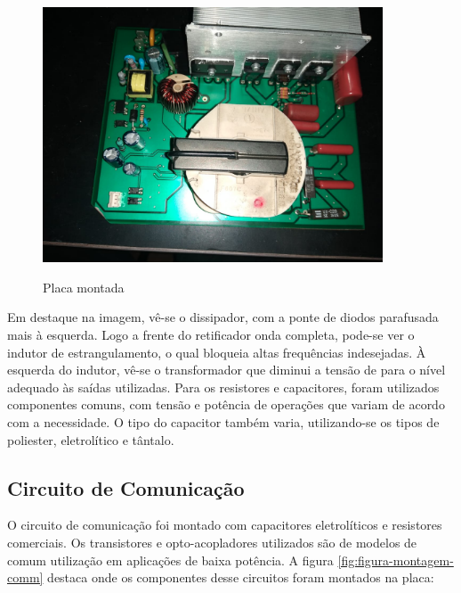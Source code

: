 \begin{figure}[H]
    \centering
    \caption{Placa montada}
    \includegraphics[width=0.9\textwidth]{./dados/figuras/placa_hv}
    \label{fig:figura-montagem-font}
\end{figure}

Em destaque na imagem, vê-se o dissipador, com a ponte de diodos parafusada mais à esquerda.  Logo a frente do retificador onda completa, pode-se ver o indutor de estrangulamento, o qual bloqueia altas frequências indesejadas. À esquerda do indutor, vê-se o transformador que diminui a tensão de para o nível adequado às saídas utilizadas.  Para os resistores e capacitores, foram utilizados componentes comuns, com tensão e potência de operações que variam de acordo com a necessidade. O tipo do capacitor também varia, utilizando-se os tipos de poliester, eletrolítico e tântalo.

\subsection{Circuito de Comunicação}
O circuito de comunicação foi montado com capacitores eletrolíticos e resistores comerciais. Os transistores e opto-acopladores utilizados são de modelos de comum utilização em aplicações de baixa potência. A figura \ref{fig:figura-montagem-comm} destaca onde os componentes desse circuitos foram montados na placa:

